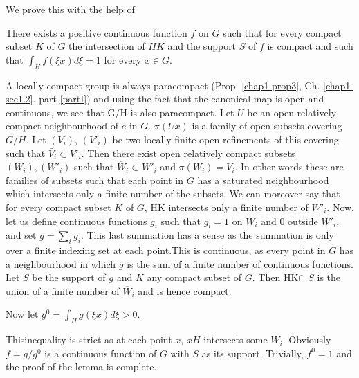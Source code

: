 We prove this with the help of

\setcounter{lem}{0}
\begin{lem}\label{partII-chap3-lem1}%
There exists a positive continuous function $f$ on  $G$  such that
for every compact subset $K$ of $G$ the intersection of $HK$ and the
support $S$ of $f$ is compact and such that $\int_H f(\xi x) d\xi=1$
for every $x\in G$. 
\end{lem}

A locally compact group is always paracompact
(Prop. \ref{chap1-prop3}, Ch. \ref{chap1-sec1.2}. part \ref{partI}) 
and using the fact that the canonical map is open and continuous, we
see that G/H is also paracompact. Let $U$ be an open relatively
compact neighbourhood of $e$ in $G$. $\pi(U x)$ is a family of open
subsets covering $G/H$. Let $(V_i)$, $(V'_i)$ be two locally finite open
refinements of this covering such that $\bar{V}_i \subset
V'_i$. Then there exist open relatively compact subsets $(W_i),(W'_i)$  
such that $\overline{W}_i \subset W'_i$ and $\pi(W_i)= V_i$. In other
words these are families of subsets such that each point in $G$ has a
saturated neighbourhood which intersects only a finite number of the
subsets. We can moreover say that for every compact subset $K$ of $G$,
HK intersects only a finite number of $W'_i$. Now, let us define
continuous functions $g_i$ such that $g_i=1$ on $W_i$ and $0$ outside
$W'_{i}$, and set $g=\sum\limits_{i} g_{i}$. This last summation has a
sense as the summation is only over a finite indexing set at each  
point.This is continuous, as every point in $G$ has a neighbourhood in
which $g$ is the sum of a finite number of continuous functions. Let
$S$ be the support of $g$ and $K$ any compact subset of $G$. Then
HK$\cap$ $S$ is the union of a finite number of $\overline{W}_{i}$ and
is hence compact. 


Now let $g^0= \int_{H} g(\xi x) d \xi>0$. 

This\pageoriginale inequality is strict as at each point $x$, $xH$
intersects some 
$W_{i}$. Obviously $f=g/g^{0}$ is a continuous function of $G$ with
$S$ as its support. Trivially, $f^0=1$ and the proof of the lemma is
complete. 

